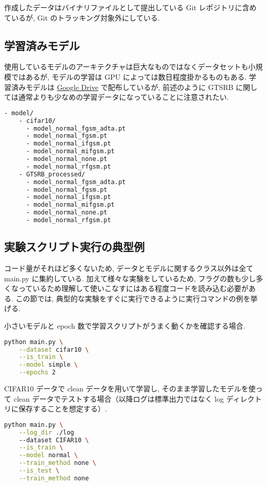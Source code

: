 作成したデータはバイナリファイルとして提出している Git レポジトリに含めているが, Git のトラッキング対象外にしている.



\subsection{学習済みモデル}
\label{subsec:appendix-model}
使用しているモデルのアーキテクチャは巨大なものではなくデータセットも小規模ではあるが, モデルの学習は GPU によっては数日程度掛かるものもある.
学習済みモデルは \href{https://drive.google.com/drive/folders/1sJJ6WQ4X-Hdsoh1YVMVz05Hn5N6hzm0E?usp=sharing}{Google Drive} で配布しているが, 前述のように GTSRB に関しては通常よりも少なめの学習データになっていることに注意されたい.
%
\begin{lstlisting}[language=bash]
  - model/
    - cifar10/
      - model_normal_fgsm_adta.pt
      - model_normal_fgsm.pt
      - model_normal_ifgsm.pt
      - model_normal_mifgsm.pt
      - model_normal_none.pt
      - model_normal_rfgsm.pt
    - GTSRB_processed/
      - model_normal_fgsm_adta.pt
      - model_normal_fgsm.pt
      - model_normal_ifgsm.pt
      - model_normal_mifgsm.pt
      - model_normal_none.pt
      - model_normal_rfgsm.pt
\end{lstlisting}
%



\subsection{実験スクリプト実行の典型例}
\label{subsec:appendix-exp-script}
コード量がそれほど多くないため, データとモデルに関するクラス以外は全て main.py に集約している.
加えて様々な実験をしているため, フラグの数も少し多くなっているため理解して使いこなすにはある程度コードを読み込む必要がある.
この節では, 典型的な実験をすぐに実行できるように実行コマンドの例を挙げる.

小さいモデルと epoch 数で学習スクリプトがうまく動くかを確認する場合.
%
\begin{lstlisting}[language=bash]
  python main.py \
    --dataset cifar10 \
    --is_train \
    --model simple \
    --epochs 2
\end{lstlisting}
%

CIFAR10 データで clean データを用いて学習し, そのまま学習したモデルを使って clean データでテストする場合（以降ログは標準出力ではなく log ディレクトリに保存することを想定する）.
%
\begin{lstlisting}[language=bash]
  python main.py \
    --log_dir ./log
    --dataset CIFAR10 \
    --is_train \
    --model normal \
    --train_method none \
    --is_test \
    --train_method none
\end{lstlisting}
%


